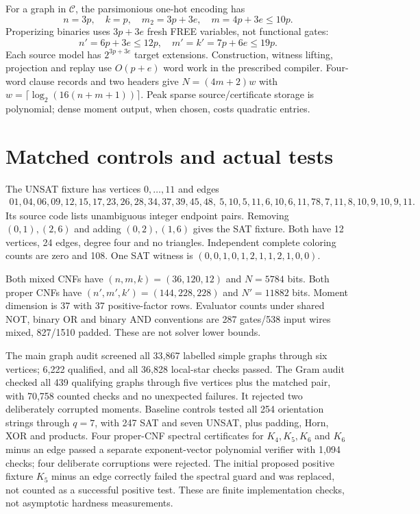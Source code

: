 \documentclass[11pt]{article}
\begin{document}
For a graph in $\mathcal C$, the parsimonious one-hot encoding has
\[
n=3p,\quad k=p,\quad m_2=3p+3e,\quad m=4p+3e\le10p.
\]
Properizing binaries uses $3p+3e$ fresh FREE variables, not functional gates:
\[
n'=6p+3e\le12p,\quad m'=k'=7p+6e\le19p.
\]
Each source model has $2^{3p+3e}$ target extensions. Construction, witness lifting, projection and replay use $O(p+e)$ word work in the prescribed compiler. Four-word clause records and two headers give $N=(4m+2)w$ with $w=\lceil\log_2(16(n+m+1))\rceil$. Peak sparse source/certificate storage is polynomial; dense moment output, when chosen, costs quadratic entries.

\section{Matched controls and actual tests}
The UNSAT fixture has vertices $0,\ldots,11$ and edges
\[
\begin{gathered}
01,04,06,09,12,15,17,23,26,28,34,37,39,45,48,\
5{,}10,5{,}11,6{,}10,6{,}11,78,7{,}11,8{,}10,9{,}10,9{,}11.
\end{gathered}
\]
Its source code lists unambiguous integer endpoint pairs. Removing $(0,1),(2,6)$ and adding $(0,2),(1,6)$ gives the SAT fixture. Both have 12 vertices, 24 edges, degree four and no triangles. Independent complete coloring counts are zero and 108. One SAT witness is $(0,0,1,0,1,2,1,1,2,1,0,0)$.

Both mixed CNFs have $(n,m,k)=(36,120,12)$ and $N=5784$ bits. Both proper CNFs have $(n',m',k')=(144,228,228)$ and $N'=11882$ bits. Moment dimension is 37 with 37 positive-factor rows. Evaluator counts under shared NOT, binary OR and binary AND conventions are 287 gates/538 input wires mixed, 827/1510 padded. These are not solver lower bounds.

The main graph audit screened all 33,867 labelled simple graphs through six vertices; 6,222 qualified, and all 36,828 local-star checks passed. The Gram audit checked all 439 qualifying graphs through five vertices plus the matched pair, with 70,758 counted checks and no unexpected failures. It rejected two deliberately corrupted moments. Baseline controls tested all 254 orientation strings through $q=7$, with 247 SAT and seven UNSAT, plus padding, Horn, XOR and products. Four proper-CNF spectral certificates for $K_4,K_5,K_6$ and $K_6$ minus an edge passed a separate exponent-vector polynomial verifier with 1,094 checks; four deliberate corruptions were rejected. The initial proposed positive fixture $K_5$ minus an edge correctly failed the spectral guard and was replaced, not counted as a successful positive test. These are finite implementation checks, not asymptotic hardness measurements.
\end{document}
